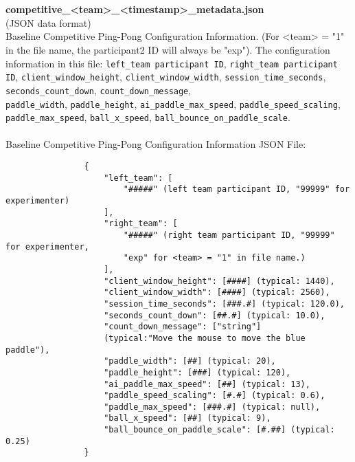 \begin{description}
\begin{addmargin}[0em]{0em}
        \textbf{\\\\}
        \begin{addmargin}[1em]{0em} %
            \label{competitive_<team>_<timestamp>_metadata.json}
            \textbf{competitive\_<team>\_<timestamp>\_metadata.json}\\(JSON data format)\\
            Baseline Competitive Ping-Pong Configuration Information.
            (For <team> = "1" in the file name, the participant2 ID will always be "exp").
            The configuration information in this file: \verb|left_team participant ID|, \verb|right_team participant ID|,
            \verb|client_window_height|, \verb|client_window_width|, \verb|session_time_seconds|,
            \verb|seconds_count_down|, \verb|count_down_message|,\\
            \verb|paddle_width|, \verb|paddle_height|, \verb|ai_paddle_max_speed|, \verb|paddle_speed_scaling|,\\
            \verb|paddle_max_speed|, \verb|ball_x_speed|, \verb|ball_bounce_on_paddle_scale|.\\\\
            Baseline Competitive Ping-Pong Configuration Information JSON File:
            \begin{verbatim}
                {
                    "left_team": [
                        "#####" (left team participant ID, "99999" for experimenter)
                    ],
                    "right_team": [
                        "#####" (right team participant ID, "99999" for experimenter,
                        "exp" for <team> = "1" in file name.)
                    ],
                    "client_window_height": [####] (typical: 1440),
                    "client_window_width": [####] (typical: 2560),
                    "session_time_seconds": [###.#] (typical: 120.0),
                    "seconds_count_down": [##.#] (typical: 10.0),
                    "count_down_message": ["string"]
                    (typical:"Move the mouse to move the blue paddle"),
                    "paddle_width": [##] (typical: 20),
                    "paddle_height": [###] (typical: 120),
                    "ai_paddle_max_speed": [##] (typical: 13),
                    "paddle_speed_scaling": [#.#] (typical: 0.6),
                    "paddle_max_speed": [###.#] (typical: null),
                    "ball_x_speed": [##] (typical: 9),
                    "ball_bounce_on_paddle_scale": [#.##] (typical: 0.25)
                }
            \end{verbatim}
        \end{addmargin} %



\end{addmargin}
\end{description}
